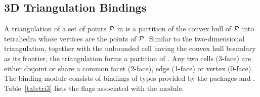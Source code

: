 \subsection{3D Triangulation Bindings}
\label{ssec:modules:tri3}
A triangulation of a set of points ${\cal P}$ in \Rthree is a partition
of the convex hull of ${\cal P}$ into tetrahedra whose vertices are the
points of ${\cal P}$. Similar to the two-dimensional triangulation,
together with the unbounded cell having the convex hull boundary as
its frontier, the triangulation forms a partition of \Rthree. Any two
cells (3-face) are either disjoint or share a common facet (2-face),
edge (1-face) or vertex (0-face).  The binding module
\iiiDTriangulationsPackage{} consists of bindings of types provided by
the \cgal{} packages \iiiDTriangulationsPackage{} and
\iiiDPeriodicTriangulationsPackage{}. Table~\ref{tab:tri3} lists the
\cmake{} flags associated with the \iiiDTriangulationsPackage{}
module.

\begin{table}[!htp]
  \caption{\iiiDTriangulationsPackage{} module flags. For the default
  value of the traits name see Table~\ref{tab:tri3:traits-default}.}
  \centering{}
  \label{tab:tri3}
\end{table}

